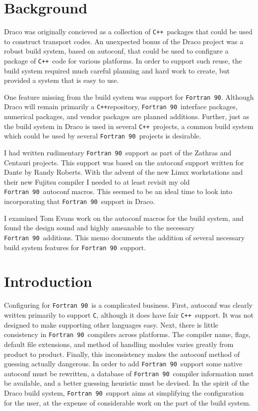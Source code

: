\documentclass[11pt]{nmemo}
\newcommand{\fninety}{\texttt{Fortran~90}}
\newcommand{\cpp}{\texttt{C++}}
\begin{document}
\section{Background}

Draco was originally concieved as a collection of \cpp\ packages that
could be used to construct transport codes.  An unexpected bonus of
the Draco project was a robust build system, based on autoconf, that
could be used to configure a package of \cpp\ code for various
platforms.  In order to support such reuse, the build system required
much careful planning and hard work to create, but provided a system
that is easy to use.

One feature missing from the build system was support for \fninety.
Although Draco will remain primarily a \cpp repository, \fninety\ 
interface packages, numerical packages, and vendor packages are
planned additions.  Further, just as the build system in Draco is used
in several \cpp\ projects, a common build system which could
be used by several \fninety\ projects is desirable.

I had written rudimentary \fninety\ support as part of the Zathras and
Centauri projects.  This support was based on the autoconf support
written for Dante by Randy Roberts.  With the advent of the new Linux
workstations and their new Fujitsu compiler I needed to at least
revisit my old \fninety\ autoconf macros.  This seemed to be an ideal
time to look into incorporating that \fninety\ support in Draco.

I examined Tom Evans work on the autoconf macros for the build system,
and found the design sound and highly ameanable to the necessary
\fninety\ additions.  This memo documents the addition of several
necessary build system features for \fninety\ support.

\newpage

\section{Introduction}

Configuring for \fninety\ is a complicated business.  First, autoconf
was clearly written primarily to support \texttt{C}, although it does
have fair \cpp\ support.  It was not designed to make supporting other
languages easy.  Next, there is little consistency in \fninety\
compilers across platforms.  The compiler name, flags, default file
extensions, and method of handling modules varies greatly from product
to product.  Finally, this inconsistency makes the autoconf method of
guessing actually dangerous.  In order to add \fninety\ support some
native autoconf must be rewritten, a database of \fninety\ compiler
information must be available, and a better guessing heuristic must be
devised.  In the spirit of the Draco build system, \fninety\ support
aims at simplifying the configuration for the user, at the expense of
considerable work on the part of the build system.
\end{document}

